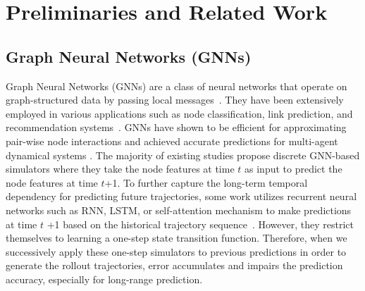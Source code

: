 \section{Preliminaries and Related Work}

\subsection{Graph Neural Networks (GNNs)}
Graph Neural Networks (GNNs) are a class of neural networks that operate on graph-structured data by passing local messages~\cite{GCN,GAT,GIN}.
They have been extensively employed in various applications such as node classification, link prediction, and recommendation systems~\cite{huang2023concept2box,SSAGA}.
GNNs have shown to be efficient for approximating pair-wise node interactions and achieved accurate predictions for multi-agent dynamical systems \cite{NRI,jure}. 
The majority of existing studies propose discrete GNN-based simulators where they take the node features at time $t$ as input to predict the node features at time $t$+1. To further capture the long-term temporal dependency for predicting future trajectories, some work utilizes recurrent neural networks such as RNN, LSTM, or self-attention mechanism to make predictions at time $t$ +1 based on the historical trajectory sequence~\cite{VGRNN,Dygnn,hgt}. However, they restrict themselves to learning a one-step state transition function. Therefore, when we successively apply these one-step simulators to previous predictions in order to generate the rollout trajectories, error accumulates and impairs the prediction accuracy, especially for long-range prediction.


